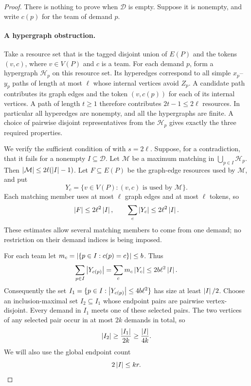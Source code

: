 \begin{proof}
There is nothing to prove when $\mathcal D$ is empty.  Suppose it is
nonempty, and write $c(p)$ for the team of demand $p$.

\paragraph{A hypergraph obstruction.}
Take a resource set that is the tagged disjoint union of $E(P)$ and the
tokens $(v,c)$, where $v\in V(P)$ and $c$ is a team.  For each demand $p$,
form a hypergraph $\mathcal H_p$ on this resource set.  Its hyperedges
correspond to all simple $x_p$--$y_p$ paths of length at most $\ell$ whose
internal vertices avoid $Z_p$.  A candidate path contributes its graph
edges and the token $(v,c(p))$ for each of its internal vertices.  A path
of length $t\ge 1$ therefore contributes $2t-1\le 2\ell$ resources.
In particular all hyperedges are nonempty, and all the hypergraphs are
finite.  A choice of pairwise disjoint representatives from the
$\mathcal H_p$ gives exactly the three required properties.

We verify the sufficient condition of  with
$s=2\ell$.  Suppose, for a contradiction, that it fails for a nonempty
$I\subseteq\mathcal D$.  Let $\mathcal M$ be a maximum matching in
$\bigcup_{p\in I}\mathcal H_p$.  Then
$\left|\mathcal M\right|\le 2\ell(\left|I\right|-1)$.  Let $F\subseteq E(P)$ be the
graph-edge resources used by $\mathcal M$, and put
\[
  Y_c=\{v\in V(P):(v,c)\text{ is used by }\mathcal M\}.
\]
Each matching member uses at most $\ell$ graph edges and at most $\ell$
tokens, so
\begin{equation}\label{eq:routing-obstruction-budgets}
  \left|F\right|\le 2\ell^2\left|I\right|,\qquad
  \sum_c\left|Y_c\right|\le 2\ell^2\left|I\right|.
\end{equation}
These estimates allow several matching members to come from one demand;
no restriction on their demand indices is being imposed.

For each team let $m_c=\left|\{p\in I:c(p)=c\}\right|\le b$.  Thus
\[
  \sum_{p\in I}\left|Y_{c(p)}\right|
  =\sum_c m_c\left|Y_c\right|
  \le 2b\ell^2\left|I\right|.
\]
Consequently the set
$I_1=\{p\in I:\left|Y_{c(p)}\right|\le 4b\ell^2\}$ has size at least
$\left|I\right|/2$.  Choose an inclusion-maximal set $I_2\subseteq I_1$ whose
endpoint pairs are pairwise vertex-disjoint.  Every demand in $I_1$ meets
one of these selected pairs.  The two vertices of any selected pair
occur in at most $2k$ demands in total, so
\begin{equation}\label{eq:routing-pair-count}
  \left|I_2\right|\ge\frac{\left|I_1\right|}{2k}
  \ge\frac{\left|I\right|}{4k}.
\end{equation}
We will also use the global endpoint count
\begin{equation}\label{eq:routing-endpoint-count}
  2\left|I\right|\le kr.
\end{equation}


\end{proof}
